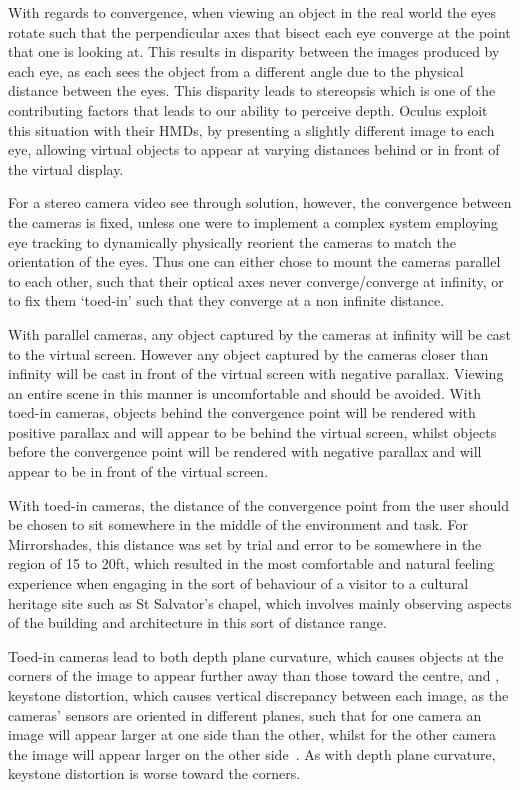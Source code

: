 With regards to convergence, when viewing an object in the real world the eyes rotate such that the perpendicular axes that bisect each eye converge at the point that one is looking at. This results in disparity between the images produced by each eye, as each sees the object from a different angle due to the physical distance between the eyes. This disparity leads to stereopsis which is one of the contributing factors that leads to our ability to perceive depth. Oculus exploit this situation with their HMDs, by presenting a slightly different image to each eye, allowing virtual objects to appear at varying distances behind or in front of the virtual display.

For a stereo camera video see through solution, however, the convergence between the cameras is fixed, unless one were to implement a complex system employing eye tracking to dynamically physically reorient the cameras to match the orientation of the eyes. Thus one can either chose to mount the cameras parallel to each other, such that their optical axes never converge/converge at infinity, or to fix them `toed-in' such that they converge at a non infinite distance.

With parallel cameras, any object captured by the cameras at infinity will be cast to the virtual screen. However any object captured by the cameras closer than infinity will be cast in front of the virtual screen with negative parallax. Viewing an entire scene in this manner is uncomfortable and should be avoided. With toed-in cameras, objects behind the convergence point will be rendered with positive parallax and will appear to be behind the virtual screen, whilst objects before the convergence point will be rendered with negative parallax and will appear to be in front of the virtual screen.

With toed-in cameras, the distance of the convergence point from the user should be chosen to sit somewhere in the middle of the environment and task. For Mirrorshades, this distance was set by trial and error to be somewhere in the region of 15 to 20ft, which resulted in the most comfortable and natural feeling experience when engaging in the sort of behaviour of a visitor to a cultural heritage site such as St Salvator's chapel, which involves mainly observing aspects of the building and architecture in this sort of distance range.

Toed-in cameras lead to both depth plane curvature, which causes objects at the corners of the image to appear further away than those toward the centre, and , keystone distortion, which causes vertical discrepancy between each image, as the cameras' sensors are oriented in different planes, such that for one camera an image will appear larger at one side than the other, whilst for the other camera the image will appear larger on the other side~\cite{Woods1993}. As with depth plane curvature, keystone distortion is worse toward the corners.

